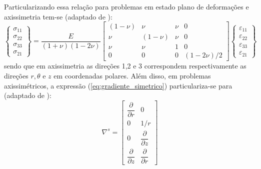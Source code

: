 Particularizando essa relação para problemas em estado plano de deformações e axissimetria tem-se (adaptado de ):
\begin{equation}
	\label{eq:Dl}
	\left\{\begin{array}{lcl}
		\sigma_{11} \\
		\sigma_{22} \\
		\sigma_{33} \\
		\sigma_{21}
	\end{array}\right\} = \dfrac{E}{(1+\nu)(1-2\nu)}
	\begin{bmatrix}
		(1-\nu)	& \nu 		& \nu  		& 0	 		\\
		\nu 	& (1-\nu)	& \nu  		& 0		 	\\
		\nu 	& \nu 		& 1   		& 0		 	\\
		0		& 0			& 0		    & (1-2\nu)/2 
	\end{bmatrix}
	\left\{\begin{array}{lcl}
		\varepsilon_{11} \\
		\varepsilon_{22} \\
		\varepsilon_{33} \\
		\varepsilon_{21}
	\end{array}\right\}
\end{equation}
sendo que em axissimetria as direções 1,2 e 3 correspondem respectivamente as direções $r, \theta$ e $z$ em coordenadas polares. Além disso, em problemas axissimétricos, a expressão (\ref{eq:gradiente_simetrico}) particulariza-se para (adaptado de ):
\begin{equation}
	\label{eq:gradiente_simetrico_AXI_EPD}
	\nabla^s = 	\begin{bmatrix}
		\dfrac{\partial}{\partial r} & 0  \\
		0 & 1/r  \\
		0 & \dfrac{\partial}{\partial z} \\
		\dfrac{\partial}{\partial z} & \dfrac{\partial}{\partial r}	
	\end{bmatrix}
\end{equation}

